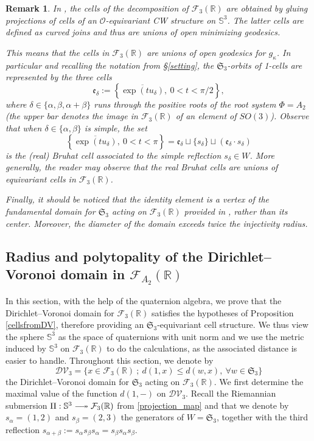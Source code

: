 \documentclass[11pt,twoside]{amsart}
\theoremstyle{plain}
\newtheorem{rem}[prop]{Remark}
\newcommand{\R}{{\mathbb R}}
\newcommand{\Sph}{\mathbb{S}}
\newcommand{\Sym}{\mathfrak{S}}
\DeclareRobustCommand\longtwoheadrightarrow
     {\relbar\joinrel\twoheadrightarrow}
\begin{document}
\begin{rem}\label{why}
In \cite{chirivi-garnier-spreafico}, the cells of the decomposition of $\mathcal{F}_3(\R)$ are obtained by gluing projections of cells of an $\mathcal{O}$-equivariant CW structure on $\Sph^3$. The latter cells are defined as \textit{curved joins} and thus are unions of open minimizing geodesics.

This means that the cells in $\mathcal{F}_3(\R)$ are unions of open geodesics for $g_\kappa$. In particular and recalling the notation from \S \ref{setting}, the $\Sym_3$-orbits of 1-cells are represented by the three cells
\[\mathfrak{e}_\delta:=\left\{\overline{\exp(tu_\delta)},~0<t<\pi/2\right\},\]
where $\delta\in\{\alpha,\beta,\alpha+\beta\}$ runs through the positive roots of the root system $\Phi=A_2$ (the upper bar denotes the image in $\mathcal{F}_3(\R)$ of an element of $SO(3)$). Observe that when $\delta\in\{\alpha,\beta\}$ is simple, the set
\[\left\{\overline{\exp(tu_\delta)},~0<t<\pi\right\}=\mathfrak{e}_\delta\sqcup\{s_\delta\}\sqcup(\mathfrak{e}_\delta \cdot s_\delta)\]
is the (real) \textit{Bruhat cell} associated to the simple reflection $s_\delta\in W$. More generally, the reader may observe that the real Bruhat cells are unions of equivariant cells in $\mathcal{F}_3(\R)$.

Finally, it should be noticed that the identity element is a vertex of the fundamental domain for $\Sym_3$ acting on $\mathcal{F}_3(\R)$ provided in \cite{chirivi-garnier-spreafico}, rather than its center. Moreover, the diameter of the domain exceeds twice the injectivity radius. %
\end{rem}






\subsection{Radius and polytopality of the Dirichlet--Voronoi domain in $\mathcal{F}_{A_2}(\R)$}

In this section, with the help of the quaternion algebra, we prove that the Dirichlet--Voronoi domain for $\mathcal{F}_3(\R)$ satisfies the hypotheses of Proposition \ref{cellsfromDV}, therefore providing an $\Sym_3$-equivariant cell structure. We thus view the sphere $\Sph^3$ as the space of quaternions with unit norm and we use the metric induced by $\Sph^3$ on $\mathcal{F}_3(\R)$ to do the calculations, as the associated distance is easier to handle. Throughout this section, we denote by
\[\mathcal{DV}_3=\{x\in\mathcal{F}_3(\R)~;~d(1,x)\le d(w,x),~\forall w\in\Sym_3\}\]
the Dirichlet--Voronoi domain for $\Sym_3$ acting on $\mathcal{F}_3(\R)$. We first determine the maximal value of the function $d(1,-)$ on $\mathcal{DV}_3$. Recall the Riemannian submersion $\Pi : \Sph^3\longtwoheadrightarrow\mathcal{F}_3(\R)$ from \eqref{projection_map} and that we denote by $s_\alpha=(1,2)$ and $s_\beta=(2,3)$ the generators of $W=\Sym_3$, together with the third reflection $s_{\alpha+\beta}:=s_\alpha s_\beta s_\alpha=s_\beta s_\alpha s_\beta$.
\end{document}
